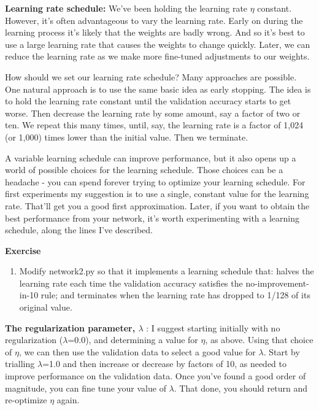 \textbf{Learning rate schedule:} We've been holding the learning rate $\eta$
constant. However, it's often advantageous to vary the learning rate. Early on during the learning process it's likely that the weights are badly wrong. And so it's best to use a large learning rate that causes the weights to change quickly. Later, we can reduce the learning rate as we make more fine-tuned adjustments to our weights.

How should we set our learning rate schedule? Many approaches are possible. One natural approach is to use the same basic idea as early stopping. The idea is to hold the learning rate constant until the validation accuracy starts to get worse. Then decrease the learning rate by some amount, say a factor of two or ten. We repeat this many times, until, say, the learning rate is a factor of 1,024 (or 1,000) times lower than the initial value. Then we terminate.

A variable learning schedule can improve performance, but it also opens up a world of possible choices for the learning schedule. Those choices can be a headache - you can spend forever trying to optimize your learning schedule. For first experiments my suggestion is to use a single, constant value for the learning rate. That'll get you a good first approximation. Later, if you want to obtain the best performance from your network, it's worth experimenting with a learning schedule, along the lines I've described.

\textbf{Exercise}


\begin{enumerate}
    \item Modify network2.py so that it implements a learning schedule that: halves the learning rate each time the validation accuracy satisfies the no-improvement-in-10 rule; and terminates when the learning rate has dropped to 1/128  of its original value. 
\end{enumerate}

\textbf{The regularization parameter, $\lambda$} : I suggest starting initially with no regularization ($\lambda$=0.0), and determining a value for $\eta$, as above. Using that choice of $\eta$, we can then use the validation data to select a good value for $\lambda$. Start by trialling $\lambda$=1.0
and then increase or decrease by factors of 10, as needed to improve performance on the validation data. Once you've found a good order of magnitude, you can fine tune your value of $\lambda$. That done, you should return and re-optimize $\eta$ again.

